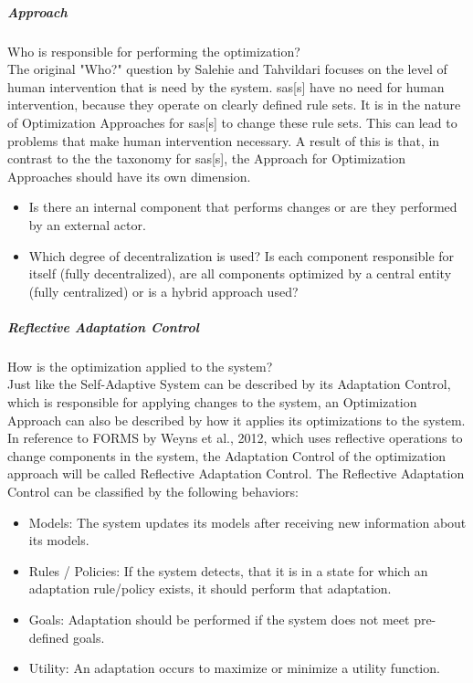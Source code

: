 \subparagraph*{Approach}
Who is responsible for performing the optimization? \\
The original "Who?" question by Salehie and Tahvildari focuses on the level of human intervention that is need by the system.
\acrlong{sas}[s] have no need for human intervention, because they operate on clearly defined rule sets.
It is in the nature of Optimization Approaches for \acrlong{sas}[s] to change these rule sets.
This can lead to problems that make human intervention necessary.
A result of this is that, in contrast to the the taxonomy for \acrlong{sas}[s], 
the Approach for Optimization Approaches should have its own dimension.
\begin{itemize}[nosep]
    \item Is there an internal component that performs changes or are they performed by an external actor.
    \item Which degree of decentralization is used?
    Is each component responsible for itself (fully decentralized), are all components optimized by a central entity (fully centralized)
    or is a hybrid approach used?
\end{itemize}

\subparagraph*{Reflective Adaptation Control}
How is the optimization applied to the system? \\
Just like the Self-Adaptive System can be described by its Adaptation Control,
which is responsible for applying changes to the system,
an Optimization Approach can also be described by how it applies its optimizations to the system.
In reference to FORMS by Weyns et al., 2012\cite*{FORMS}, which uses reflective operations to change
components in the system, the Adaptation Control of the optimization approach will be called Reflective Adaptation Control.
The Reflective Adaptation Control can be classified by the following behaviors:
\begin{itemize}[nosep]
    \item Models: The system updates its models after receiving new information about its models.
    \item Rules / Policies: If the system detects, that it is in a state for which an adaptation rule/policy exists,
    it should perform that adaptation.
    \item Goals: Adaptation should be performed if the system does not meet pre-defined goals.
    \item Utility: An adaptation occurs to maximize or minimize a utility function.
\end{itemize}


